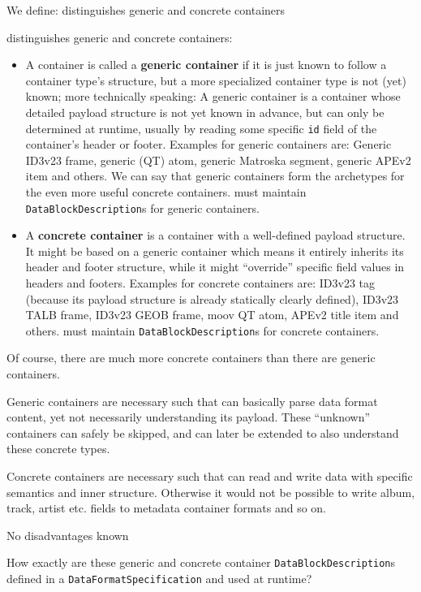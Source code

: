 We define:
{%
\COMPdataFormatManagement{} distinguishes generic and concrete containers
}
{%
\COMPdataFormatManagement{} distinguishes generic and concrete containers:
\begin{itemize}
\item A container is called a \textbf{generic container} if it is just known to follow a container type's structure, but a more specialized container type is not (yet) known; more technically speaking: A generic container is a container whose detailed payload structure is not yet known in advance, but can only be determined at runtime, usually by reading some specific \texttt{id} field of the container's header or footer. Examples for generic containers are: Generic ID3v23 frame, generic (QT) atom, generic Matroska segment, generic APEv2 item and others. We can say that generic containers form the archetypes for the even more useful concrete containers. \COMPdataFormatManagement{} must maintain \texttt{DataBlockDescription}s for generic containers.
\item A \textbf{concrete container} is a container with a well-defined payload structure. It might be based on a generic container which means it entirely inherits its header and footer structure, while it might ``override'' specific field values in headers and footers. Examples for concrete containers are: ID3v23 tag (because its payload structure is already statically clearly defined), ID3v23 TALB frame, ID3v23 GEOB frame, moov QT atom, APEv2 title item and others. \COMPdataFormatManagement{} must maintain \texttt{DataBlockDescription}s for concrete containers. 
\end{itemize}

Of course, there are much more concrete containers than there are generic containers.
}
{%
Generic containers are necessary such that \LibName{} can basically parse data format content, yet not necessarily understanding its payload. These ``unknown'' containers can safely be skipped, and \LibName{} can later be extended to also understand these concrete types.

Concrete containers are necessary such that \LibName{} can read and write data with specific semantics and inner structure. Otherwise it would not be possible to write album, track, artist etc. fields to metadata container formats and so on.
}
{%
No disadvantages known
}

How exactly are these generic and concrete container \texttt{DataBlockDescription}s defined in a \texttt{DataFormatSpecification} and used at runtime?

